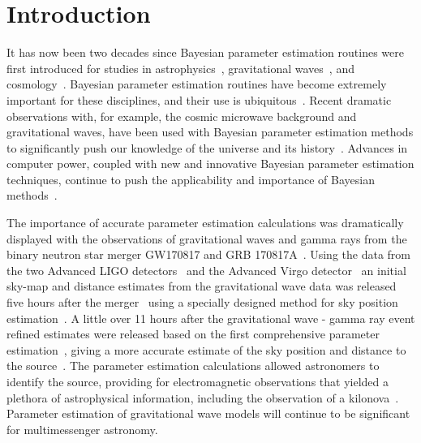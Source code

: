 \documentclass[aps,reprint,amsmath,amssymb,showpacs,showkeys]{revtex4-1}%
\begin{document}



\maketitle

\section{Introduction}

It has now been two decades since Bayesian parameter estimation routines were first introduced for studies in astrophysics~\cite{1994AJ....107.1295S}, gravitational waves~\cite{PhysRevD.58.082001}, and cosmology~\cite{0264-9381-18-14-306,1538-4357-563-2-L95}. Bayesian parameter estimation routines have become extremely important for these disciplines, and their use is ubiquitous~\cite{doi:10.1146/annurev-astro-082214-122339}. 
Recent dramatic observations with, for example, the cosmic microwave background and gravitational waves, have been used with Bayesian parameter estimation methods to significantly push our knowledge of the universe and its history~\cite{0067-0049-208-2-19, Planck2013,Planck2015, PhysRevLett.116.061102,PhysRevLett.116.241102,doi:10.1111/j.1740-9713.2016.00896.x,PhysRevLett.119.161101}. Advances in computer power, coupled with new and innovative Bayesian parameter estimation techniques, continue to push the applicability and importance of Bayesian methods~\cite{doi:10.1093/nsr/nwx044}.

The importance of accurate parameter estimation calculations was dramatically displayed with the observations of gravitational waves and gamma rays from the binary neutron star merger GW170817 and GRB 170817A~\cite{PhysRevLett.119.161101,2041-8205-848-2-L14}. Using the data from the two Advanced LIGO detectors~\cite{0264-9381-32-7-074001} and the Advanced Virgo detector~\cite{0264-9381-32-2-024001} an initial sky-map and distance estimates from the gravitational wave data was released five hours after the merger~\cite{2041-8205-848-2-L12} using a specially designed method for sky position estimation~\cite{PhysRevD.93.024013}. A little over 11 hours after the gravitational wave - gamma ray event refined estimates were released based on the first comprehensive parameter estimation~\cite{Veitch:2015}, giving a more accurate estimate of the sky position and distance to the source~\cite{2041-8205-848-2-L12}. The parameter estimation calculations allowed astronomers to identify the source, providing for electromagnetic observations that yielded a plethora of astrophysical information, including the observation of a kilonova~\cite{2041-8205-848-2-L12}. Parameter estimation of gravitational wave models  will continue to be significant  for multimessenger astronomy.
\end{document}
